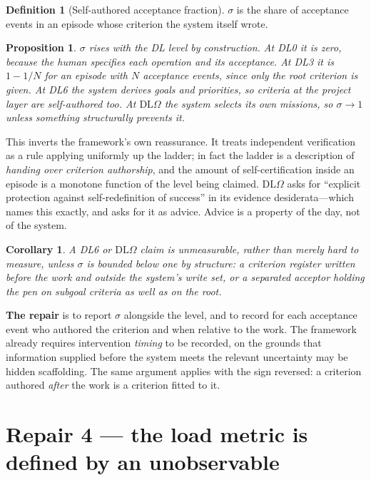 \documentclass[11pt]{article}
\newtheorem{proposition}{Proposition}
\newtheorem{corollary}{Corollary}
\theoremstyle{definition}
\newtheorem{definition}{Definition}
\newcommand{\DLO}{\ensuremath{\mathrm{DL}\Omega}}
\begin{document}
\begin{definition}[Self-authored acceptance fraction]
$\sigma$ is the share of acceptance events in an episode whose criterion the system itself wrote.
\end{definition}

\begin{proposition}\label{prop:sigma}
$\sigma$ rises with the DL level by construction. At DL0 it is zero, because the human specifies each operation and its acceptance. At DL3 it is $1-1/N$ for an episode with $N$ acceptance events, since only the root criterion is given. At DL6 the system derives goals and priorities, so criteria at the project layer are self-authored too. At \DLO{} the system selects its own missions, so $\sigma\to 1$ unless something structurally prevents it.
\end{proposition}

This inverts the framework's own reassurance. It treats independent verification as a rule applying uniformly up the ladder; in fact the ladder is a description of \emph{handing over criterion authorship}, and the amount of self-certification inside an episode is a monotone function of the level being claimed. \DLO{} asks for ``explicit protection against self-redefinition of success'' in its evidence desiderata---which names this exactly, and asks for it as advice. Advice is a property of the day, not of the system.

\begin{corollary}\label{cor:sigma}
A DL6 or \DLO{} claim is unmeasurable, rather than merely hard to measure, unless $\sigma$ is bounded below one by structure: a criterion register written before the work and outside the system's write set, or a separated acceptor holding the pen on subgoal criteria as well as on the root.
\end{corollary}

\textbf{The repair} is to report $\sigma$ alongside the level, and to record for each acceptance event who authored the criterion and when relative to the work. The framework already requires intervention \emph{timing} to be recorded, on the grounds that information supplied before the system meets the relevant uncertainty may be hidden scaffolding. The same argument applies with the sign reversed: a criterion authored \emph{after} the work is a criterion fitted to it.

\section{Repair 4 --- the load metric is defined by an unobservable}\label{sec:load}
\end{document}
